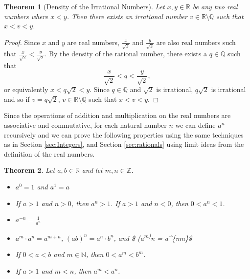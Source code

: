 \documentclass[
]{book}
\newtheorem{theorem}{Theorem}[chapter]
\theoremstyle{definition}
\theoremstyle{definition}
\theoremstyle{definition}
\theoremstyle{remark}
\begin{document}
\begin{theorem}[Density of the Irrational Numbers]
\protect\hypertarget{thm:unnamed-chunk-117}{}{\label{thm:unnamed-chunk-117} {} }Let \(x,y\in \mathbb{R}\) be any two real numbers where \(x<y\). Then there exists an irrational number \(v\in \mathbb{R}\setminus\mathbb{Q}\) such that \(x<v<y\).
\end{theorem}

\begin{proof}
{}Since \(x\) and \(y\) are real numbers, \(\frac{x}{\sqrt{2}}\) and \(\frac{y}{\sqrt{2}}\) are also real numbers such that \(\frac{x}{\sqrt{2}}<\frac{y}{\sqrt{2}}\). By the density of the rational number, there exists a \(q\in \mathbb{Q}\) such that \[\frac{x}{\sqrt{2}} < q < \frac{y}{\sqrt{2}},\] or equivalently \(x<q\sqrt{2}<y\). Since \(q\in \mathbb{Q}\) and \(\sqrt{2}\) is irrational, \(q\sqrt{2}\) is irrational and so if \(v=q\sqrt{2}\), \(v\in \mathbb{R}\setminus\mathbb{Q}\) such that \(x<v<y\).
\end{proof}

Since the operations of addition and multiplication on the real numbers are associative and commutative, for each natural number \(n\) we can define \(a^n\) recursively and we can prove the following properties using the same techniques as in Section \ref{sec:Integers}, and Section \ref{sec:rationals} using limit ideas from the definition of the real numbers.

\begin{theorem}
\protect\hypertarget{thm:exponents-real-integers}{}{\label{thm:exponents-real-integers} }Let \(a,b \in \mathbb{R}\) and let \(m,n\in \mathbb{Z}\).

\begin{itemize}
\item
  \(a^0=1\) and \(a^1=a\)
\item
  If \(a>1\) and \(n>0\), then \(a^n >1\). If \(a>1\) and \(n<0\), then \(0<a^n<1\).
\item
  \(a^{-n} = \frac{1}{a^n}\)
\item
  \(a^m\cdot a^n = a^{m+n}\), \((ab)^n=a^n\cdot b^n\), and \$ (a\textsuperscript{m)}n = a\^{}\{mn\}\$
\item
  If \(0<a<b\) and \(m\in \mathbb{N}\), then \(0<a^m<b^m\).
\item
  If \(a>1\) and \(m<n\), then \(a^m<a^n\).
\end{itemize}
\end{theorem}
\end{document}
